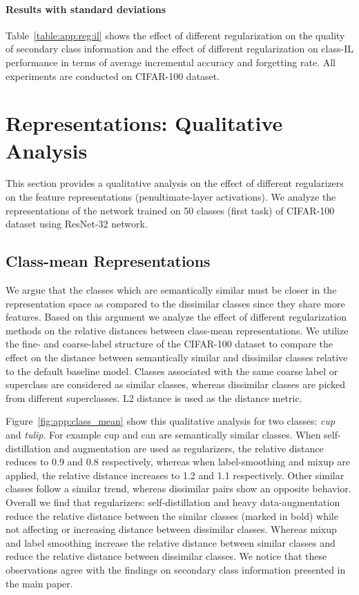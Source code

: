 \documentclass[final]{cvpr}
\begin{document}
\paragraph{Results with standard deviations}
Table~\ref{table:app:reg:il} shows the effect of different regularization on the quality of secondary class information and the effect of different regularization on class-IL performance in terms of average incremental accuracy and forgetting rate. All experiments are conducted on CIFAR-100 dataset. 

 


\section{Representations: Qualitative Analysis}

This section provides a qualitative analysis on the effect of different regularizers on the feature representations (penultimate-layer activations). We analyze the representations of the network trained on 50 classes (first task) of CIFAR-100 dataset using ResNet-32 network. 



\subsection{Class-mean Representations}\label{sec:app:class_mean}

We argue that the classes which are semantically similar must be closer in the representation space as compared to the dissimilar classes since they share more features.
Based on this argument we analyze the effect of different regularization methods on the relative distances between class-mean representations. 
We utilize the fine- and coarse-label structure of the CIFAR-100 dataset to compare the effect on the distance between semantically similar and dissimilar classes relative to the default baseline model. Classes associated with the same coarse label or superclass are considered as similar classes, whereas dissimilar classes are picked from different superclasses. L2 distance is used as the distance metric.


Figure~\ref{fig:app:class_mean} show this qualitative analysis for two classes: \textit{cup} and \textit{tulip}. For example cup and can are semantically similar classes. When self-distillation and augmentation are used as regularizers, the relative distance reduces to 0.9 and 0.8 respectively, whereas when label-smoothing and mixup are applied, the relative distance increases to 1.2 and 1.1 respectively. Other similar classes follow a similar trend, whereas dissimilar pairs show an opposite behavior. 
Overall we find that regularizers: self-distillation and heavy data-augmentation reduce the relative distance between the similar classes (marked in bold) while not affecting or increasing distance between dissimilar classes. Whereas mixup and label smoothing increase the relative distance between similar classes and reduce the relative distance between dissimilar classes. We notice that these observations agree with the findings on secondary class information presented in the main paper. 
\end{document}
